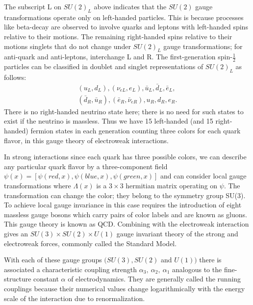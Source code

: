The subscript L on $SU(2)_L$ above indicates that the $SU(2)$ gauge transformations operate only on left-handed particles. This is because processes like beta-decay are observed to involve quarks and leptons with left-handed spins relative to their motions. The remaining right-handed spins relative to their motions singlets that do not change under $SU(2)_L$ gauge transformations; for anti-quark and anti-leptons, interchange L and R. The first-generation spin-$\frac{1}{2}$ particles can be classified in doublet and singlet representations of $SU(2)_L$ as follows:
    \begin{eqnarray}
    (u_L,d_L),(\nu_{eL},e_L),\bar{u}_L,\bar{d}_L,\bar{e}_L, \nonumber \\
    (\bar{d}_R,\bar{u}_R),(\bar{e}_R,\bar{\nu}_{eR}),u_R,d_R,e_R.   \nonumber
    \end{eqnarray}
There is no right-handed neutrino state here; there is no need for such states to exist if the neutrino is massless. Thus we have 15 left-handed (and 15 right-handed) fermion states in each generation counting three colors for each quark flavor, in this gauge theory of electroweak interactions.


In strong interactions since each quark has three possible colors, we can describe any particular quark flavor by a three-component field $\psi(x)=[\psi(red,x),\psi(blue,x),\psi(green,x)]$ and can consider local gauge transformations where $\Lambda(x)$ is a $3\times 3$ hermitian matrix operating on $\psi$. The transformation can change the color; they belong to the symmetry group SU(3). To achieve local gauge invariance in this case requires the introduction of eight massless gauge bosons which carry pairs of color labels and are known as gluons. This gauge theory is known as QCD. Combining with the electroweak interaction gives an $SU(3)\times SU(2) \times U(1)$ gauge invariant theory of the strong and electroweak forces, commonly called the Standard Model.

With each of these gauge groups $(SU(3),SU(2)$ and $U(1))$ there is associated a characteristic coupling strength $\alpha_3,~\alpha_2,~\alpha_1$ analogous to the fine-structure constant $\alpha$ of electrodynamics. They are generally called the running couplings because their numerical values change logarithmically with the energy scale of the interaction due to renormalization.

